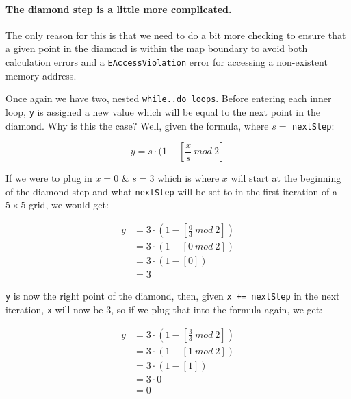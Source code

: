 \documentclass{article}
\begin{document}
\paragraph{The diamond step is a little more complicated.} The only reason for this is that we need to do a bit more checking to ensure that a given point in the diamond is within the map boundary to avoid both calculation errors and a \texttt{EAccessViolation} error for accessing a non-existent memory address.

Once again we have two, nested \texttt{while..do loops}. Before entering each inner loop, \texttt{y} is assigned a new value which will be equal to the next point in the diamond. Why is this the case? Well, given the formula, where $s=$ \texttt{nextStep}:

\begin{equation}
y=s \cdot (1 - \left[\frac{x}{s} \ mod \ 2\right]
\end{equation}

If we were to plug in $x=0$ \& $s=3$ which is where $x$ will start at the beginning of the diamond step and what \texttt{nextStep} will be set to in the first iteration of a $5 \times 5$ grid, we would get:

\begin{equation}
\begin{split}
y&=3 \cdot (1 - \left[\frac{0}{3} \ mod \ 2\right]) \\
&=3 \cdot (1 - \left[0 \ mod \ 2\right]) \\
&=3 \cdot (1 - [0]) \\
&=3
\end{split}
\end{equation}

\texttt{y} is now the right point of the diamond, then, given \texttt{x += nextStep} in the next iteration, \texttt{x} will now be $3$, so if we plug that into the formula again, we get:

\begin{equation}
\begin{split}
y&=3 \cdot (1 - \left[\frac{3}{3} \ mod \ 2\right]) \\
&=3 \cdot (1 - \left[1 \ mod \ 2\right]) \\
&=3 \cdot (1 - [1]) \\
&=3 \cdot 0 \\
&=0
\end{split}
\end{equation}
\end{document}

